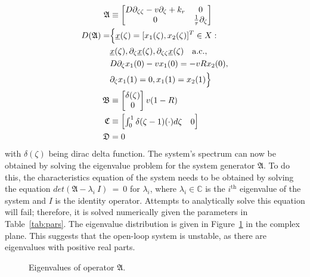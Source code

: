 \begin{equation} \label{eq:operator_A}
    \begin{aligned}
        \mathfrak{A} &\equiv
        \begin{bmatrix}
            D \partial_{\zeta \zeta} - v \partial_\zeta + k_r & 0 \\
            0 & \frac{1}{\tau} \partial_\zeta
        \end{bmatrix} \\
        D(\mathfrak{A}) =& \Bigl\{ \underline{x}(\zeta) = [x_1(\zeta), x_2(\zeta)]^T \in X:\\
        &\underline{x}(\zeta), \partial_\zeta \underline{x}(\zeta), \partial_{\zeta \zeta} \underline{x}(\zeta) \quad \mathrm{a.c.},\\
        &D \partial_\zeta x_1(0) - v x_1(0) = -v R x_2(0),\\
        &\partial_\zeta x_1(1) = 0,
        x_1(1) = x_2(1) \Bigr\}\\
        \mathfrak{B} &\equiv
        \begin{bmatrix}
            \delta(\zeta) \\
            0
        \end{bmatrix} v(1-R) \\
        \mathfrak{C} &\equiv
        \begin{bmatrix}
            \int_0^1 \delta(\zeta-1) (\cdot) d\zeta & 0
        \end{bmatrix} \\
        \mathfrak{D} &= 0
    \end{aligned}
\end{equation}
with $\delta(\zeta)$ being dirac delta function. The system's spectrum can now be obtained by solving the eigenvalue problem for the system generator $\mathfrak{A}$. To do this, the characteristics equation of the system needs to be obtained by solving the equation $det(\mathfrak{A}-\lambda_i~I)~=~0$ for $\lambda_i$, where $\lambda_i \in \mathbb{C}$ is the $i^{\text{th}}$ eigenvalue of the system and $I$ is the identity operator. Attempts to analytically solve this equation will fail; therefore, it is solved numerically given the parameters in Table~\ref{tab:pars}. The eigenvalue distribution is given in Figure~\ref{fig:eigval_dist} in the complex plane. This suggests that the open-loop system is unstable, as there are eigenvalues with positive real parts.

\begin{figure}[!htbp]
    \centering
    
    \caption{Eigenvalues of operator $\mathfrak{A}$.}
    \label{fig:eigval_dist}
\end{figure}

